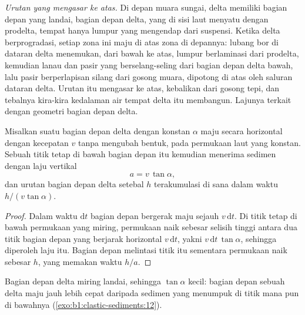 \emph{Urutan yang mengasar ke atas.} Di depan muara sungai, delta memiliki bagian depan yang landai, bagian depan delta, yang di sisi laut menyatu dengan prodelta, tempat hanya lumpur yang mengendap dari suspensi. Ketika delta berprogradasi, setiap zona ini maju di atas zona di depannya: lubang bor di dataran delta menemukan, dari bawah ke atas, lumpur berlaminasi dari prodelta, kemudian lanau dan pasir yang berselang-seling dari bagian depan delta bawah, lalu pasir berperlapisan silang dari gosong muara, dipotong di atas oleh saluran dataran delta. Urutan itu mengasar ke atas, kebalikan dari gosong tepi, dan tebalnya kira-kira kedalaman air tempat delta itu membangun. Lajunya terkait dengan geometri bagian depan delta.

\begin{proposition}\label{prop:b1:clastic-sediments:progradation}
Misalkan suatu bagian depan delta dengan  konstan $\alpha$ maju secara horizontal dengan kecepatan $v$ tanpa mengubah bentuk, pada permukaan laut yang konstan. Sebuah titik tetap di bawah bagian depan itu kemudian menerima sedimen dengan laju vertikal
\[
  a = v\,\tan\alpha,
\]
dan urutan bagian depan delta setebal $h$ terakumulasi di sana dalam waktu $h/(v\tan\alpha)$.
\end{proposition}

\begin{proof}
Dalam waktu $\mathrm dt$ bagian depan bergerak maju sejauh $v\,\mathrm dt$. Di titik tetap di bawah permukaan yang miring, permukaan naik sebesar selisih tinggi antara dua titik bagian depan yang berjarak horizontal $v\,\mathrm dt$, yakni $v\,\mathrm dt\,\tan\alpha$, sehingga diperoleh laju itu. Bagian depan melintasi titik itu sementara permukaan naik sebesar $h$, yang memakan waktu $h/a$.
\end{proof}

Bagian depan delta miring landai, sehingga $\tan\alpha$ kecil: bagian depan sebuah delta maju jauh lebih cepat daripada sedimen yang menumpuk di titik mana pun di bawahnya (\cref{exo:b1:clastic-sediments:12}).


